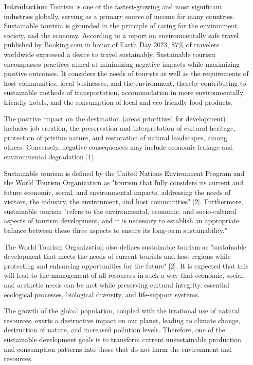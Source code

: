 {\bfseries Introduction} Tourism is one of the fastest-growing and most
significant industries globally, serving as a primary source of income
for many countries. Sustainable tourism is grounded in the principle of
caring for the environment, society, and the economy. According to a
report on environmentally safe travel published by Booking.com in honor
of Earth Day 2023, 87\% of travelers worldwide expressed a desire to
travel sustainably. Sustainable tourism encompasses practices aimed at
minimizing negative impacts while maximizing positive outcomes. It
considers the needs of tourists as well as the requirements of host
communities, local businesses, and the environment, thereby contributing
to sustainable methods of transportation, accommodation in more
environmentally friendly hotels, and the consumption of local and
eco-friendly food products.

The positive impact on the destination (areas prioritized for
development) includes job creation, the preservation and interpretation
of cultural heritage, protection of pristine nature, and restoration of
natural landscapes, among others. Conversely, negative consequences may
include economic leakage and environmental degradation {[}1{]}.

Sustainable tourism is defined by the United Nations Environment Program
and the World Tourism Organization as "tourism that fully considers its
current and future economic, social, and environmental impacts,
addressing the needs of visitors, the industry, the environment, and
host communities" {[}2{]}. Furthermore, sustainable tourism "refers to
the environmental, economic, and socio-cultural aspects of tourism
development, and it is necessary to establish an appropriate balance
between these three aspects to ensure its long-term sustainability."

The World Tourism Organization also defines sustainable tourism as
"sustainable development that meets the needs of current tourists and
host regions while protecting and enhancing opportunities for the
future" {[}2{]}. It is expected that this will lead to the management of
all resources in such a way that economic, social, and aesthetic needs
can be met while preserving cultural integrity, essential ecological
processes, biological diversity, and life-support systems.

The growth of the global population, coupled with the irrational use of
natural resources, exerts a destructive impact on our planet, leading to
climate change, destruction of nature, and increased pollution levels.
Therefore, one of the sustainable development goals is to transform
current unsustainable production and consumption patterns into those
that do not harm the environment and resources.

